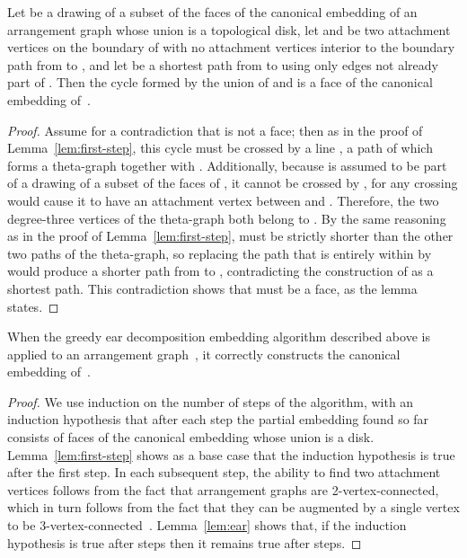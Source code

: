 \documentclass[oribibl]{llncs}
\begin{document}
\begin{lemma}
\label{lem:ear}
Let  be a drawing of a subset of the faces of the canonical embedding of an arrangement graph  whose union is a topological disk, let  and  be two attachment vertices on the boundary of  with no attachment vertices interior to the boundary path  from  to , and let  be a shortest path from  to  using only edges not already part of . Then the cycle formed by the union of  and  is a face of the canonical embedding of~.
\end{lemma}

\begin{proof}
Assume for a contradiction that  is not a face; then as in the proof of Lemma~\ref{lem:first-step}, this cycle must be crossed by a line , a path  of which forms a theta-graph together with . Additionally, because  is assumed to be part of a drawing of a subset of the faces of , it cannot be crossed by , for any crossing would cause it to have an attachment vertex between  and . Therefore, the two degree-three vertices of the theta-graph both belong to . By the same reasoning as in the proof of Lemma~\ref{lem:first-step},  must be strictly shorter than the other two paths of the theta-graph, so replacing the path that is entirely within  by  would produce a shorter path from  to , contradicting the construction of  as a shortest path. This contradiction shows that  must be a face, as the lemma states.
\end{proof}

\begin{theorem}
When the greedy ear decomposition embedding algorithm described above is applied to an arrangement graph~, it correctly constructs the canonical embedding of~.
\end{theorem}

\begin{proof}
We use induction on the number of steps of the algorithm, with an induction hypothesis that after each step the partial embedding found so far consists of faces of the canonical embedding whose union is a disk. Lemma~\ref{lem:first-step} shows as a base case that the induction hypothesis is true after the first step. In each subsequent step, the ability to find two attachment vertices follows from the fact that arrangement graphs are 2-vertex-connected, which in turn follows from the fact that they can be augmented by a single vertex to be 3-vertex-connected~\cite{BosEveWis-IJCGA-03}. Lemma~\ref{lem:ear} shows that, if the induction hypothesis is true after  steps then it remains true after  steps. 
\end{proof}
\end{document}

